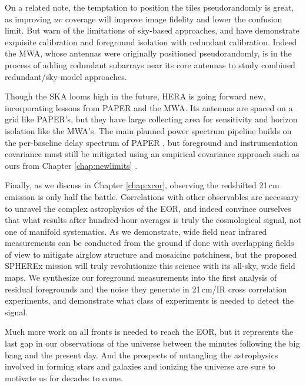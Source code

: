 On a related note, the temptation to position the tiles pseudorandomly is great, as improving $uv$ coverage will improve image fidelity and lower the confusion limit. But \citet{beardsley16,ewallwice16b,barry16} warn of the limitations of sky-based approaches, and \citet{ali15} have demonstrate exquisite calibration and foreground isolation with redundant calibration. Indeed the MWA, whose antennas were originally positioned pseudorandomly, is in the process of adding redundant subarrays near its core antennas to study combined redundant/sky-model approaches. 

Though the SKA looms high in the future, HERA is going forward new, incorporating lessons from PAPER and the MWA. Its antennas are spaced on a grid like PAPER's, but they have large collecting area for sensitivity and horizon isolation like the MWA's. The main planned power spectrum pipeline builds on the per-baseline delay spectrum of PAPER \citep{deboer16,ewallwice16,neben16b,nithya16} , but foreground and instrumentation covariance must still be mitigated using an empirical covariance approach such as ours from Chapter \ref{chap:newlimits} \citep{parsons14,ali15}. 

Finally, as we discuss in Chapter \ref{chap:xcor}, observing the redshifted 21\,cm emission is only half the battle. Correlations with other observables are necessary to unravel the complex astrophysics of the EOR, and indeed convince ourselves that what results after hundred-hour averages is truly the cosmological signal, not one of manifold systematics. As we demonstrate, wide field near infrared measurements can be conducted from the ground if done with overlapping fields of view to mitigate airglow structure and mosaicinc patchiness, but the proposed SPHEREx mission will truly revolutionize this science with its all-sky, wide field maps. We synthesize our foreground measurements into the first analysis of residual foregrounds and the noise they generate in 21\,cm/IR cross correlation experiments, and demonstrate what class of experiments is needed to detect the signal.

Much more work on all fronts is needed to reach the EOR, but it represents the last gap in our observations of the universe between the minutes following the big bang and the present day. And the prospects of untangling the astrophysics involved in forming stars and galaxies and ionizing the universe are sure to motivate us for decades to come.

